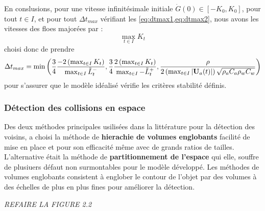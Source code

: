 En conslusions, pour une vitesse infinitésimale initiale $\dot{G}(0) \in [-K_0, K_0]$, pour tout $t \in I$, et pour tout $\Delta t_{max}$ vérifiant les \cref{eq:dtmax1,eq:dtmax2}, nous avons les vitesses des floes majorées par :
$$
\max_{t \in I}{K_t}
$$
\citeauthor{rabatel2015thesis} choisi donc de prendre 
$$
\Delta t_{max} = \min{ \left( \frac{3}{4} \frac{ -2 \left( \max_{t \in I}{K_t} \right)}{ \max_{t \in I}{\tilde{L}_t^{-}}}, \frac{3}{4} \frac{2 \left( \max_{t \in I}{K_t} \right) }{ \max_{t \in I}{-\tilde{L}_t^{+}}}, \frac{\rho}{2 \left(  \max_{t \in I}{  \vert \bm{\mathrm{U}}_a(t) \vert } \right)  \sqrt{\rho_a C_a \rho_w C_w}} \right)}
$$
pour s'assurer que le modèle idéalisé vérifie les critères stabilité définis.

\subsubsection{Détection des collisions en espace}

Des deux méthodes principales usilisées dans la littérature pour la détection des voisins, \citeauthor{rabatel2015thesis} a choisi la méthode de \textbf{hierachie de volumes englobants} facilité de mise en place et pour son efficacité même avec de grands ratios de tailles. L'alternative était la méthode de \textbf{partitionnement de l'espace} qui elle, souffre de plusiuers défaut non surmontables pour le modèle développé. Les méthodes de volumes englobants consistent à englober le contour de l’objet par des volumes à des échelles de plus en plus fines pour améliorer la détection.



\textit{REFAIRE LA FIGURE 2.2}

